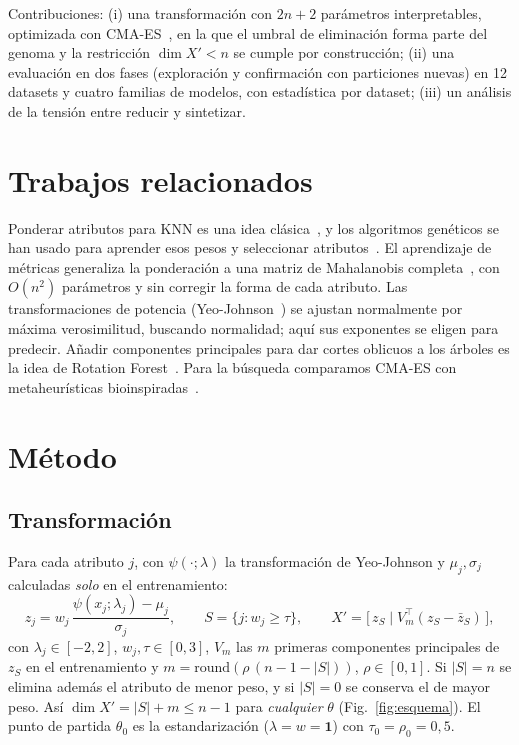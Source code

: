 \documentclass[runningheads]{llncs}
\begin{document}
Contribuciones: (i) una transformación con $2n+2$ parámetros interpretables, optimizada con CMA-ES~\cite{hansen2001},
en la que el umbral de eliminación forma parte del genoma y la restricción $\dim X'<n$ se cumple por construcción;
(ii) una evaluación en dos fases (exploración y confirmación con particiones nuevas) en 12 datasets y cuatro familias
de modelos, con estadística por dataset; (iii) un análisis de la tensión entre reducir y sintetizar.

\section{Trabajos relacionados}
Ponderar atributos para KNN es una idea clásica~\cite{wettschereck1997}, y los algoritmos genéticos se han usado
para aprender esos pesos y seleccionar atributos~\cite{raymer2000}. El aprendizaje de métricas generaliza la
ponderación a una matriz de Mahalanobis completa~\cite{weinberger2009}, con $O(n^2)$ parámetros y sin corregir la
forma de cada atributo. Las transformaciones de potencia (Yeo-Johnson~\cite{yeo2000}) se ajustan normalmente por
máxima verosimilitud, buscando normalidad; aquí sus exponentes se eligen para predecir. Añadir componentes
principales para dar cortes oblicuos a los árboles es la idea de Rotation Forest~\cite{rodriguez2006}. Para la
búsqueda comparamos CMA-ES con metaheurísticas bioinspiradas~\cite{fister2013}.

\section{Método}
\subsection{Transformación}
Para cada atributo $j$, con $\psi(\cdot;\lambda)$ la transformación de Yeo-Johnson y $\mu_j,\sigma_j$ calculadas
\emph{solo} en el entrenamiento:
\begin{equation}
z_j = w_j\,\frac{\psi(x_j;\lambda_j)-\mu_j}{\sigma_j},\qquad S=\{j: w_j\ge\tau\},\qquad
X'=\big[\,z_S\;\big|\;V_m^\top(z_S-\bar z_S)\,\big],
\end{equation}
con $\lambda_j\in[-2,2]$, $w_j,\tau\in[0,3]$, $V_m$ las $m$ primeras componentes principales de $z_S$ en el
entrenamiento y $m=\mathrm{round}(\rho\,(n-1-|S|))$, $\rho\in[0,1]$. Si $|S|=n$ se elimina además el atributo de
menor peso, y si $|S|=0$ se conserva el de mayor peso. Así $\dim X'=|S|+m\le n-1$ para \emph{cualquier} $\theta$
(Fig.~\ref{fig:esquema}). El punto de partida $\theta_0$ es la estandarización ($\lambda=w=\mathbf 1$) con
$\tau_0=\rho_0=0{,}5$.
\end{document}
